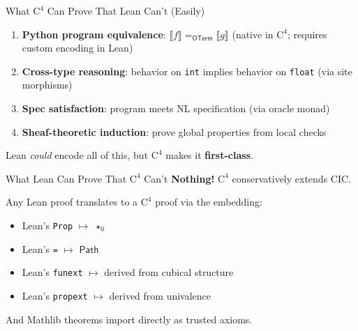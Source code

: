 \documentclass[aspectratio=169,11pt]{beamer}
\newcommand{\Cfour}{\mathrm{C}^4}
\newcommand{\Path}{\mathsf{Path}}
\newcommand{\OTerm}{\mathsf{OTerm}}
\newcommand{\den}[1]{\llbracket #1 \rrbracket}
\begin{document}
\begin{frame}{What $\Cfour$ Can Prove That Lean Can't (Easily)}
\begin{enumerate}
\item \textbf{Python program equivalence}: $\den{f} =_\OTerm \den{g}$ (native in $\Cfour$; requires custom encoding in Lean)
\item \textbf{Cross-type reasoning}: behavior on \texttt{int} implies behavior on \texttt{float} (via site morphisms)
\item \textbf{Spec satisfaction}: program meets NL specification (via oracle monad)
\item \textbf{Sheaf-theoretic induction}: prove global properties from local checks
\end{enumerate}

\vspace{0.5em}
Lean \emph{could} encode all of this, but $\Cfour$ makes it \textbf{first-class}.
\end{frame}

\begin{frame}{What Lean Can Prove That $\Cfour$ Can't}
\textbf{Nothing!} $\Cfour$ conservatively extends CIC.

\vspace{0.5em}
Any Lean proof translates to a $\Cfour$ proof via the embedding:
\begin{itemize}
\item Lean's \texttt{Prop} $\mapsto$ $\star_0$
\item Lean's \texttt{=} $\mapsto$ $\Path$
\item Lean's \texttt{funext} $\mapsto$ derived from cubical structure
\item Lean's \texttt{propext} $\mapsto$ derived from univalence
\end{itemize}

\vspace{0.5em}
And Mathlib theorems import directly as trusted axioms.
\end{frame}
\end{document}
